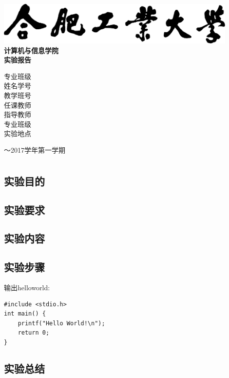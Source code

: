 \documentclass[a4paper]{ctexrep}
\begin{document}
	\begin{titlepage} %
		\begin{center}
		\includegraphics[width=12cm]{cover.png}\\[1cm]
		{ \kaishu \textbf{计算机与信息学院}\\[0.5cm]
		\textbf{实验报告}\\[3cm]}
		\begin{flushleft}
			{ \songti 专业班级\\[0.5cm]
			姓名学号\\[0.5cm]
			教学班号\\[0.5cm]
			任课教师\\[0.5cm]
			指导教师\\[0.5cm]
			专业班级\\[0.5cm]
			实验地点}
		\end{flushleft}
		\vspace*{\fill}
		{ ～2017学年第一学期}
		\end{center}
	\end{titlepage}
\tableofcontents %
\chapter{}
\section{实验目的}

\section{实验要求}

\section{实验内容}

\section{实验步骤}
输出helloworld:

\begin{lstlisting}
#include <stdio.h>
int main() {
	printf("Hello World!\n");
	return 0;
}
\end{lstlisting}
\section{实验总结}
\end{document}
